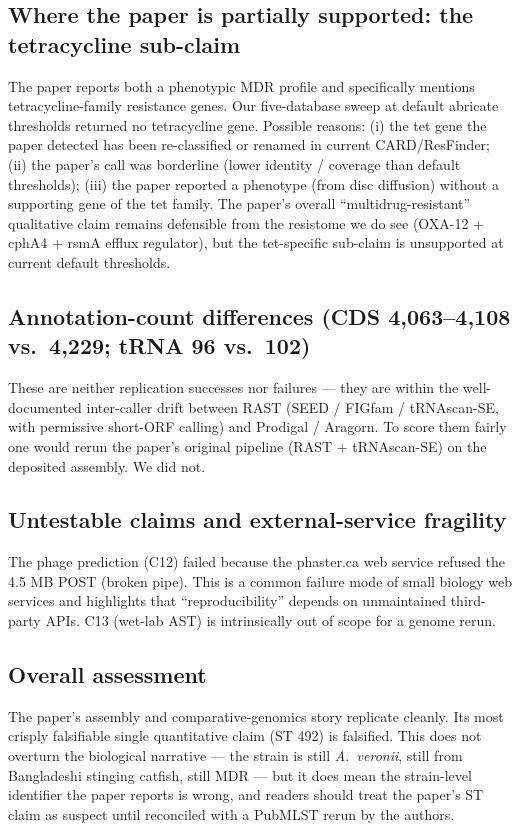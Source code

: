 \documentclass[11pt,letterpaper]{article}
\begin{document}
\subsection*{Where the paper is partially supported: the tetracycline sub-claim}
The paper reports both a phenotypic MDR profile and specifically mentions tetracycline-family resistance genes. Our five-database sweep at default abricate thresholds returned no tetracycline gene. Possible reasons: (i) the tet gene the paper detected has been re-classified or renamed in current CARD/ResFinder; (ii) the paper's call was borderline (lower identity / coverage than default thresholds); (iii) the paper reported a phenotype (from disc diffusion) without a supporting gene of the tet family. The paper's overall ``multidrug-resistant'' qualitative claim remains defensible from the resistome we do see (OXA-12 + cphA4 + rsmA efflux regulator), but the tet-specific sub-claim is unsupported at current default thresholds.

\subsection*{Annotation-count differences (CDS 4{,}063--4{,}108 vs.\ 4{,}229; tRNA 96 vs.\ 102)}
These are neither replication successes nor failures --- they are within the well-documented inter-caller drift between RAST (SEED / FIGfam / tRNAscan-SE, with permissive short-ORF calling) and Prodigal / Aragorn. To score them fairly one would rerun the paper's original pipeline (RAST + tRNAscan-SE) on the deposited assembly. We did not.

\subsection*{Untestable claims and external-service fragility}
The phage prediction (C12) failed because the phaster.ca web service refused the 4.5 MB POST (broken pipe). This is a common failure mode of small biology web services and highlights that ``reproducibility'' depends on unmaintained third-party APIs. C13 (wet-lab AST) is intrinsically out of scope for a genome rerun.

\subsection*{Overall assessment}
The paper's assembly and comparative-genomics story replicate cleanly. Its most crisply falsifiable single quantitative claim (ST 492) is falsified. This does not overturn the biological narrative --- the strain is still \textit{A.\ veronii}, still from Bangladeshi stinging catfish, still MDR --- but it does mean the strain-level identifier the paper reports is wrong, and readers should treat the paper's ST claim as suspect until reconciled with a PubMLST rerun by the authors.
\end{document}
